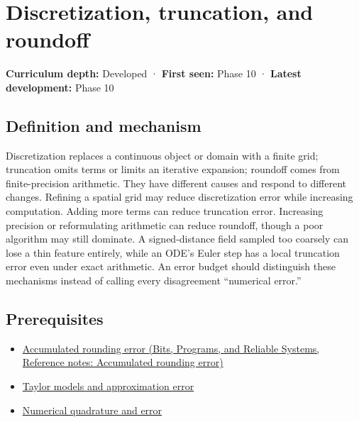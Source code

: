\hypertarget{appendix-6b0648b2b8e8}{}\label{referencestart:appendix-6b0648b2b8e8}
\section{Discretization, truncation, and roundoff}\label{appendix-6b0648b2b8e8-discretization-truncation-and-roundoff}

\textbf{Curriculum depth:} Developed · \textbf{First seen:} Phase 10 · \textbf{Latest development:} Phase 10

\begin{allmightroledefinition}

\subsection{Definition and mechanism}\label{appendix-6b0648b2b8e8-definition-and-mechanism}

Discretization replaces a continuous object or domain with a finite grid; truncation omits terms or limits an iterative expansion; roundoff comes from finite-precision arithmetic. They have different causes and respond to different changes. Refining a spatial grid may reduce discretization error while increasing computation. Adding more terms can reduce truncation error. Increasing precision or reformulating arithmetic can reduce roundoff, though a poor algorithm may still dominate. A signed-distance field sampled too coarsely can lose a thin feature entirely, while an ODE's Euler step has a local truncation error even under exact arithmetic. An error budget should distinguish these mechanisms instead of calling every disagreement ``numerical error.''

\end{allmightroledefinition}

\subsection{Prerequisites}\label{appendix-6b0648b2b8e8-prerequisites}

\begin{itemize}
\tightlist
\item
  \href{../01-Bits-Programs-and-Reliable-Systems/main.pdf\#nameddest=appendix-f82e270791c8}{Accumulated rounding error (Bits, Programs, and Reliable Systems, Reference notes: Accumulated rounding error)}
\item
  \hyperref[appendix-32f39e9a3738]{Taylor models and approximation error}
\item
  \hyperref[appendix-80521eae6b71]{Numerical quadrature and error}
\end{itemize}

